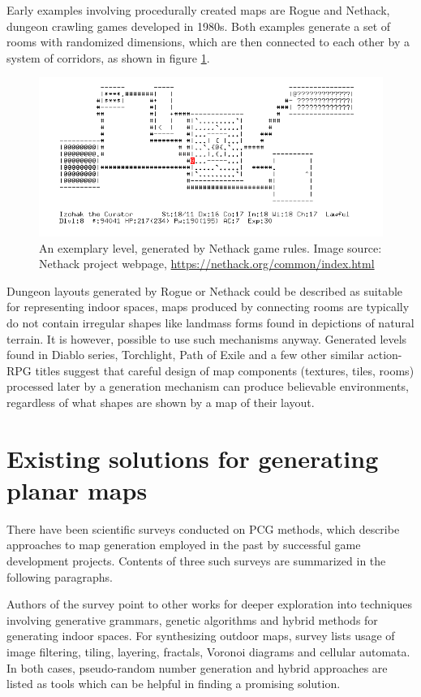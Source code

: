 \documentclass[12pt]{report}
\begin{document}
Early examples involving procedurally created maps are Rogue and Nethack, dungeon crawling games developed in 1980s. Both examples generate a set of rooms with randomized dimensions, which are then connected to each other by a system of corridors, as shown in figure \ref{fig:nethack}.
 

\begin{figure}[h]
	\centering
	\includegraphics[width=0.7\linewidth]{images/nethack}
	\caption{An exemplary level, generated by Nethack game rules. Image source: Nethack project webpage, \url{https://nethack.org/common/index.html}}
	\label{fig:nethack}
\end{figure}

Dungeon layouts generated by Rogue or Nethack could be described as suitable for representing indoor spaces, maps produced by connecting rooms are typically do not contain irregular shapes like landmass forms found in depictions of natural terrain. It is however, possible to use such mechanisms anyway. Generated levels found in Diablo series, Torchlight, Path of Exile and a few other similar action-RPG titles suggest that careful design of map components (textures, tiles, rooms) processed later by a generation mechanism can produce believable environments, regardless of what shapes are shown by a map of their layout. 
	

\section{Existing solutions for generating planar maps}

There have been scientific surveys conducted on PCG methods, which describe approaches to map generation employed in the past by successful game development projects. Contents of three such surveys are summarized in the following paragraphs.

Authors of the survey \autocite{hendrikx2013procedural} point to other works for deeper exploration into techniques involving generative grammars, genetic algorithms and hybrid methods for generating indoor spaces. For synthesizing outdoor maps, survey lists usage of image filtering, tiling, layering, fractals, Voronoi diagrams and cellular automata. In both cases, pseudo-random number generation and hybrid approaches are listed as tools which can be helpful in finding a promising solution. 
\end{document}
